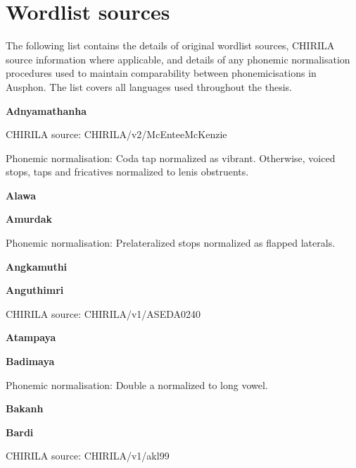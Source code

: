 \chapter{Wordlist sources}

The following list contains the details of original wordlist sources, CHIRILA source information where applicable, and details of any phonemic normalisation procedures used to maintain comparability between phonemicisations in Ausphon. The list covers all languages used throughout the thesis.

\setlength{\parindent}{0pt}
\setlength{\parskip}{0.1in}

\textbf{Adnyamathanha}

CHIRILA source: CHIRILA/v2/McEnteeMcKenzie


Phonemic normalisation: Coda tap normalized as vibrant. Otherwise,
voiced stops, taps and fricatives normalized to lenis obstruents.

\textbf{Alawa}


\textbf{Amurdak}


Phonemic normalisation: Prelateralized stops normalized as flapped
laterals.

\textbf{Angkamuthi}


\newpage


\textbf{Anguthimri}

CHIRILA source: CHIRILA/v1/ASEDA0240


\textbf{Atampaya}


\textbf{Badimaya}


Phonemic normalisation: Double a normalized to long vowel.

\textbf{Bakanh}


\textbf{Bardi}

CHIRILA source: CHIRILA/v1/akl99


